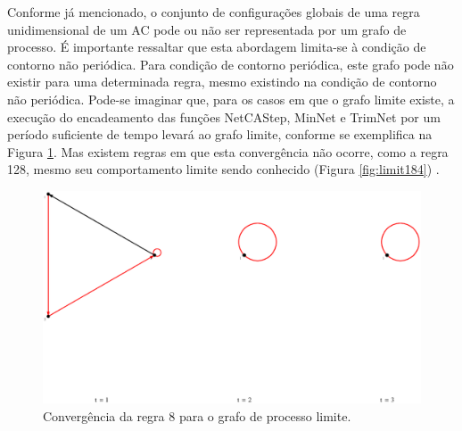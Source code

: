 \documentclass[12pt,a4paper]{article}
\begin{document}
Conforme já mencionado, o conjunto de configurações globais de uma regra
unidimensional de um AC pode ou não ser representada por um grafo de
processo. É importante ressaltar que esta abordagem limita-se à condição
de contorno não periódica. Para condição de contorno periódica, este grafo
pode não existir para uma determinada regra, mesmo existindo na condição de
contorno não periódica. Pode-se imaginar que, para os casos em que o grafo
limite existe, a execução do encadeamento das funções NetCAStep, MinNet e
TrimNet por um período suficiente de tempo levará ao grafo limite, conforme
se exemplifica na Figura \ref{fig:r8t}. Mas existem regras em que esta
convergência não ocorre, como a regra 128, mesmo seu comportamento limite
sendo conhecido (Figura \ref{fig:limit184}) .

\begin{figure}[htp]
\begin{center}
\includegraphics[scale=0.5]{img/Rule8.eps}
\caption{Convergência da regra 8 para o grafo de processo limite.}
\label{fig:r8t}
\end{center}
\end{figure}
\end{document}
